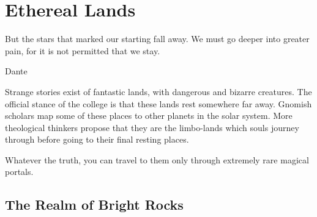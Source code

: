 \chapter{Ethereal Lands}
\label{ether}

\epigraph{But the stars that marked our starting fall away.
We must go deeper into greater pain,
for it is not permitted that we stay.}{Dante}

\begin{multicols}{2}

\noindent
Strange stories exist of fantastic lands, with dangerous and bizarre creatures.  The official stance of the \gls{college} is that these lands rest somewhere far away.
Gnomish scholars map some of these places to other planets in the solar system.
More theological thinkers propose that they are the limbo-lands which souls journey through before going to their final resting places.

Whatever the truth, you can travel to them only through extremely rare magical portals.

\end{multicols}

\section{The Realm of Bright Rocks}
\label{brightrocks}

